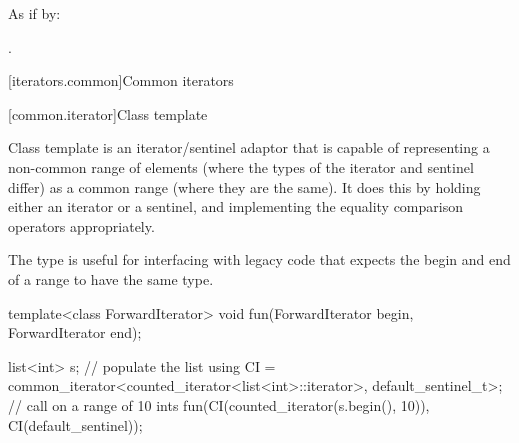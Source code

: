 \documentclass{wg21}
\begin{document}
\begin{itemdescr}
	\pnum
	\effects As if by: 
	
	\pnum
	\returns {}.
\end{itemdescr}

[iterators.common]{Common iterators}

[common.iterator]{Class template }

\pnum
Class template  is an iterator/sentinel adaptor that is
capable of representing a non-common range of elements (where the types of the
iterator and sentinel differ) as a common range (where they are the same). It
does this by holding either an iterator or a sentinel, and implementing the
equality comparison operators appropriately.

\pnum
\begin{note}
	The  type is useful for interfacing with legacy
	code that expects the begin and end of a range to have the same type.
\end{note}

\pnum
\begin{example}
	\begin{codeblock}
		template<class ForwardIterator>
		void fun(ForwardIterator begin, ForwardIterator end);
		
		list<int> s;
		// populate the list 
		using CI = common_iterator<counted_iterator<list<int>::iterator>, default_sentinel_t>;
		// call  on a range of 10 ints
		fun(CI(counted_iterator(s.begin(), 10)), CI(default_sentinel));
	\end{codeblock}
\end{example}
\end{document}
